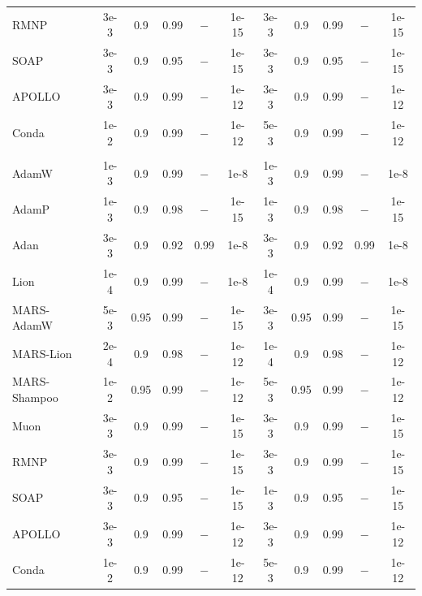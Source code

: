 \begin{table}[!htbp]
{\begin{tabular}{l ccccc | ccccc}
RMNP         & 3e-3 & 0.9  & 0.99 & $-$   & 1e-15 & 3e-3 & 0.9  & 0.99 & $-$   & 1e-15 \\
SOAP         & 3e-3 & 0.9  & 0.95 & $-$   & 1e-15 & 3e-3 & 0.9  & 0.95 & $-$   & 1e-15 \\
APOLLO       & 3e-3 & 0.9  & 0.99 & $-$   & 1e-12 & 3e-3 & 0.9  & 0.99 & $-$   & 1e-12 \\
Conda        & 1e-2 & 0.9  & 0.99 & $-$   & 1e-12 & 5e-3 & 0.9  & 0.99 & $-$   & 1e-12 \\
\midrule
\rowcolor{basebg}
\multicolumn{11}{l}{\textit{Gated DeltaNet}} \\
AdamW        & 1e-3 & 0.9  & 0.99 & $-$   & 1e-8  & 1e-3 & 0.9  & 0.99 & $-$   & 1e-8  \\
AdamP        & 1e-3 & 0.9  & 0.98 & $-$   & 1e-15 & 1e-3 & 0.9  & 0.98 & $-$   & 1e-15 \\
Adan         & 3e-3 & 0.9  & 0.92 & 0.99 & 1e-8  & 3e-3 & 0.9  & 0.92 & 0.99 & 1e-8  \\
Lion         & 1e-4 & 0.9  & 0.99 & $-$   & 1e-8  & 1e-4 & 0.9  & 0.99 & $-$   & 1e-8  \\
MARS-AdamW   & 5e-3 & 0.95 & 0.99 & $-$   & 1e-15 & 3e-3 & 0.95 & 0.99 & $-$   & 1e-15 \\
MARS-Lion    & 2e-4 & 0.9  & 0.98 & $-$   & 1e-12 & 1e-4 & 0.9  & 0.98 & $-$   & 1e-12 \\
MARS-Shampoo & 1e-2 & 0.95 & 0.99 & $-$   & 1e-12 & 5e-3 & 0.95 & 0.99 & $-$   & 1e-12 \\
Muon         & 3e-3 & 0.9  & 0.99 & $-$   & 1e-15 & 3e-3 & 0.9  & 0.99 & $-$   & 1e-15 \\
RMNP         & 3e-3 & 0.9  & 0.99 & $-$   & 1e-15 & 3e-3 & 0.9  & 0.99 & $-$   & 1e-15 \\
SOAP         & 3e-3 & 0.9  & 0.95 & $-$   & 1e-15 & 1e-3 & 0.9  & 0.95 & $-$   & 1e-15 \\
APOLLO       & 3e-3 & 0.9  & 0.99 & $-$   & 1e-12 & 3e-3 & 0.9  & 0.99 & $-$   & 1e-12 \\
Conda        & 1e-2 & 0.9  & 0.99 & $-$   & 1e-12 & 5e-3 & 0.9  & 0.99 & $-$   & 1e-12 \\
\bottomrule
\end{tabular}}
\label{tab:appendix_fwe_stage2_combined_expanded}
\end{table}